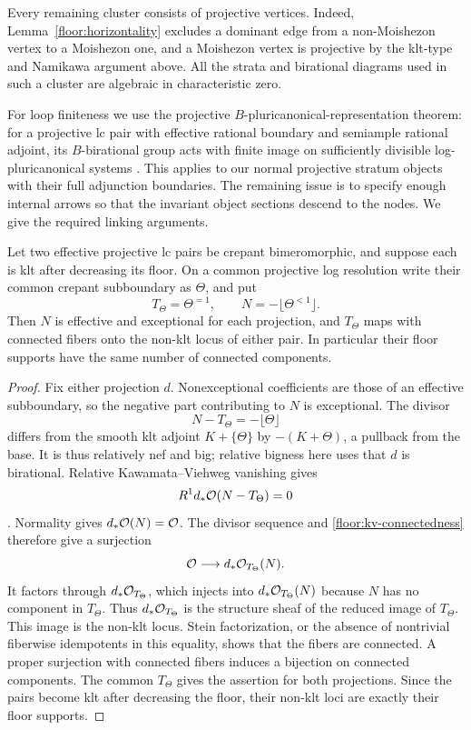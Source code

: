 Every remaining cluster consists of projective vertices.  Indeed,
Lemma~\ref{floor:horizontality} excludes a dominant edge from a
non-Moishezon vertex to a Moishezon one, and a Moishezon vertex is
projective by the klt-type and Namikawa argument above.  All the
strata and birational diagrams used in such a cluster are
algebraic in characteristic zero.

For loop finiteness we use the projective
$B$-pluricanonical-representation theorem: for a projective lc
pair with effective rational boundary and semiample rational
adjoint, its $B$-birational group acts with finite image on
sufficiently divisible log-pluricanonical systems
\cite[Theorem~1.1]{FujinoGongyoPluricanonical}.  This applies to
our normal projective stratum objects with their full
adjunction boundaries.  The remaining issue is to specify enough
internal arrows so that the invariant object sections descend
to the nodes.  We give the required linking arguments.

\begin{lemma}
\label{floor:nklt-components}
Let two effective projective lc pairs be crepant bimeromorphic,
and suppose each is klt after decreasing its floor.  On a common
projective log resolution write their common crepant
subboundary as $\Theta$, and put
\[
 T_\Theta=\Theta^{=1},\qquad
 N=-\lfloor\Theta^{<1}\rfloor.
\]
Then $N$ is effective and exceptional for each projection, and
$T_\Theta$ maps with connected fibers onto the non-klt locus
of either pair.  In particular their floor supports have the
same number of connected components.
\end{lemma}

\begin{proof}
Fix either projection $d$.  Nonexceptional coefficients are
those of an effective subboundary, so the negative part
contributing to $N$ is exceptional.  The divisor
\[
 N-T_\Theta=-\lfloor\Theta\rfloor
\]
differs from the smooth klt adjoint $K+\{\Theta\}$ by
$-(K+\Theta)$, a pullback from the base.  It is thus relatively
nef and big; relative bigness here uses that $d$ is birational.
Relative Kawamata--Viehweg vanishing gives
\begin{equation}
 \label{floor:kv-connectedness}
 R^1d_*\mathcal{O}(N-T_\Theta)=0
\end{equation}
\cite{KawamataViehwegVanishing}.  Normality gives
$d_*\mathcal{O}(N)=\mathcal{O}$.  The divisor sequence and
\eqref{floor:kv-connectedness} therefore give a surjection
\[
 \mathcal{O}\longrightarrow d_*\mathcal{O}_{T_\Theta}(N).
\]
It factors through $d_*\mathcal{O}_{T_\Theta}$, which injects into
$d_*\mathcal{O}_{T_\Theta}(N)$ because $N$ has no component in
$T_\Theta$.  Thus $d_*\mathcal{O}_{T_\Theta}$ is the structure
sheaf of the reduced image of $T_\Theta$.  This image is
the non-klt locus.  Stein factorization, or the absence of
nontrivial fiberwise idempotents in this equality, shows
that the fibers are connected.  A proper surjection with
connected fibers induces a bijection on connected
components.  The common $T_\Theta$ gives the assertion
for both projections.  Since the pairs become klt after
decreasing the floor, their non-klt loci are exactly their
floor supports.
\end{proof}

